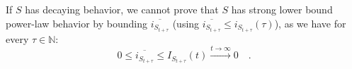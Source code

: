 \documentclass[../../main.tex]{subfiles}
\begin{document}
    \begin{remark}
        If $S$ has decaying behavior, we cannot prove that $S$ has strong lower bound power-law behavior by bounding $\overline{i_{S_{t + \tau}}}$ (using $\overline{i_{S_{t + \tau}}} \leq i_{S_{t + \tau}}(\tau)$), as we have for every $\tau \in \mathbb{N}$:
        \[
            0 \leq \overline{i_{S_{t + \tau}}} \leq I_{S_{t + \tau}}(t) \xrightarrow{t \to \infty} 0 \quad .
        \]
    \end{remark}

\end{document}
